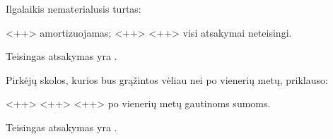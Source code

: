 \begin{tasks}
  \begin{task}
    \begin{condition}
      Ilgalaikis nematerialusis turtas:
      \begin{enumerate}
         <++>
         amortizuojamas;
         <++>
         <++>
         visi atsakymai neteisingi.
      \end{enumerate}
    \end{condition}
    \begin{solution}
      Teisingas atsakymas yra .
    \end{solution}
  \end{task}

  \begin{task}
    \begin{condition}
      Pirkėjų skolos, kurios bus grąžintos vėliau nei po vienerių
      metų, priklauso:
      \begin{enumerate}
         <++>
         <++>
         <++>
         po vienerių metų gautinoms sumoms.
      \end{enumerate}
    \end{condition}
    \begin{solution}
      Teisingas atsakymas yra .
    \end{solution}
  \end{task}
  
\end{tasks}

